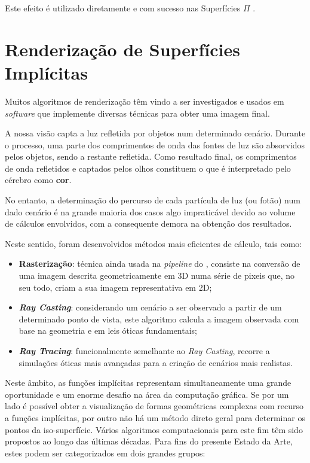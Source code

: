 Este efeito é utilizado diretamente e com sucesso nas Superfícies $\Pi$ \cite{Raposo2019}.


\section{Renderização de Superfícies Implícitas}
\label{sec::arte:render}

Muitos algoritmos de renderização têm vindo a ser investigados e usados em \textit{software} que implemente diversas técnicas para obter uma imagem final.

A nossa visão capta a luz refletida por objetos num determinado cenário. Durante o processo, uma parte dos comprimentos de onda das fontes de luz são absorvidos pelos objetos, sendo a restante refletida. Como resultado final, os comprimentos de onda refletidos e captados pelos olhos constituem o que é interpretado pelo cérebro como \textbf{cor}.

No entanto, a determinação do percurso de cada partícula de luz (ou fotão) num dado cenário é na grande maioria dos casos algo impraticável devido ao volume de cálculos envolvidos, com a consequente demora na obtenção dos resultados.

Neste sentido, foram desenvolvidos métodos mais eficientes de cálculo, tais como:

\begin{itemize}
    \item \textbf{Rasterização}: técnica ainda usada na \textit{pipeline} do \opengl, consiste na conversão de uma imagem descrita geometricamente em 3D numa série de pixeis que, no seu todo, criam a sua imagem representativa em 2D;
    
    \item \textbf{\itshape Ray Casting}: considerando um cenário a ser observado a partir de um determinado ponto de vista, este algoritmo calcula a imagem observada com base na geometria e em leis óticas fundamentais;
    
    \item \textbf{\itshape Ray Tracing}: funcionalmente semelhante ao \textit{Ray Casting}, recorre a simulações óticas mais avançadas para a criação de cenários mais realistas.
\end{itemize}


Neste âmbito, as funções implícitas representam simultaneamente uma grande oportunidade e um enorme desafio na área da computação gráfica. Se por um lado é possível obter a visualização de formas geométricas complexas com recurso a funções implícitas, por outro não há um método direto geral para determinar os pontos da iso-superfície. Vários algoritmos computacionais para este fim têm sido propostos ao longo das últimas décadas. Para fins do presente Estado da Arte, estes podem ser categorizados em dois grandes grupos:

